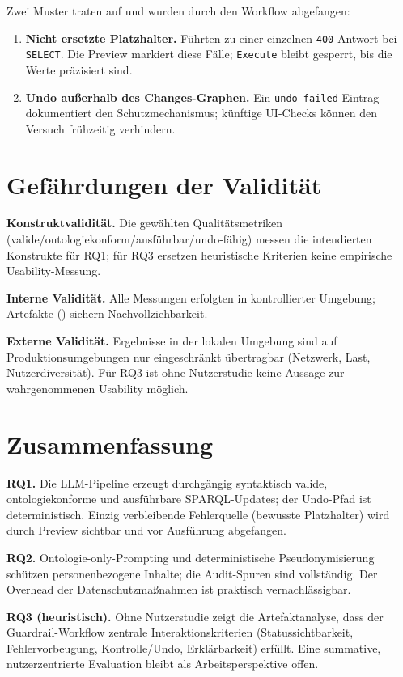 Zwei Muster traten auf und wurden durch den Workflow abgefangen:
\begin{enumerate}
  \item \textbf{Nicht ersetzte Platzhalter.} Führten zu einer einzelnen \texttt{400}-Antwort bei \texttt{SELECT}. Die Preview markiert diese Fälle; \texttt{Execute} bleibt gesperrt, bis die Werte präzisiert sind.
  \item \textbf{Undo außerhalb des Changes-Graphen.} Ein \texttt{undo\_failed}-Eintrag dokumentiert den Schutzmechanismus; künftige UI-Checks können den Versuch frühzeitig verhindern.
\end{enumerate}

\section{Gefährdungen der Validität}
\label{sec:validity}

\textbf{Konstruktvalidität.} Die gewählten Qualitätsmetriken (valide/ontologiekonform/ausführbar/undo-fähig) messen die intendierten Konstrukte für RQ1; für RQ3 ersetzen heuristische Kriterien keine empirische Usability-Messung.

\textbf{Interne Validität.} Alle Messungen erfolgten in kontrollierter Umgebung; Artefakte () sichern Nachvollziehbarkeit.

\textbf{Externe Validität.} Ergebnisse in der lokalen Umgebung sind auf Produktionsumgebungen nur eingeschränkt übertragbar (Netzwerk, Last, Nutzerdiversität). Für RQ3 ist ohne Nutzerstudie keine Aussage zur wahrgenommenen Usability möglich.

\section{Zusammenfassung}
\label{sec:eval-fazit}

\textbf{RQ1.} Die LLM-Pipeline erzeugt durchgängig syntaktisch valide, ontologiekonforme und ausführbare SPARQL-Updates; der Undo-Pfad ist deterministisch. Einzig verbleibende Fehlerquelle (bewusste Platzhalter) wird durch Preview sichtbar und vor Ausführung abgefangen.

\textbf{RQ2.} Ontologie-only-Prompting und deterministische Pseudonymisierung schützen personenbezogene Inhalte; die Audit-Spuren sind vollständig. Der Overhead der Datenschutzmaßnahmen ist praktisch vernachlässigbar.

\textbf{RQ3 (heuristisch).} Ohne Nutzerstudie zeigt die Artefaktanalyse, dass der Guardrail-Workflow zentrale Interaktionskriterien (Statussichtbarkeit, Fehlervorbeugung, Kontrolle/Undo, Erklärbarkeit) erfüllt. Eine summative, nutzerzentrierte Evaluation bleibt als Arbeitsperspektive offen.

